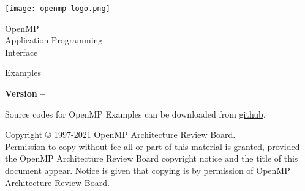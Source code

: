 
  \begin{titlepage}
    \begin{flushleft}
     \hspace{-6em} \texttt{[image: openmp-logo.png]}
    \end{flushleft}

    \begin{adjustwidth}{-0.75in}{0in}
    \begin{center}
      \Huge
      \textsf{OpenMP\\Application Programming\\Interface}

      \vspace{0.5in}\textsf{Examples}\vspace{-0.7in}
      \normalsize

      \vspace{1.0in}

      \textbf{Version \PVER{} -- \VERDATE}
    \end{center}
    \end{adjustwidth}

    \vspace{2.3in} %

Source codes for OpenMP \PVER{} Examples can be downloaded from
 \href{https://github.com/OpenMP/Examples/tree/v\VER}{github}.\\

\begin{adjustwidth}{0pt}{1em}\setlength{\parskip}{0.25\baselineskip}%
Copyright \copyright{} 1997-2021 OpenMP Architecture Review Board.\\
Permission to copy without fee all or part of this material is granted,
provided the OpenMP Architecture Review Board copyright notice and
the title of this document appear. Notice is given that copying is by
permission of OpenMP Architecture Review Board.\end{adjustwidth}

  \end{titlepage}


\cleardoublepage



